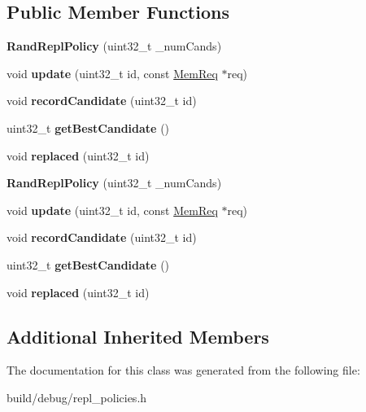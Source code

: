 \subsection*{Public Member Functions}
\begin{DoxyCompactItemize}
\item 
\hypertarget{classRandReplPolicy_a1e08886e13510e155af165e8c3ac0120}{{\bfseries Rand\-Repl\-Policy} (uint32\-\_\-t \-\_\-num\-Cands)}\label{classRandReplPolicy_a1e08886e13510e155af165e8c3ac0120}

\item 
\hypertarget{classRandReplPolicy_a80a6976f9f7c25dad50db398462876a3}{void {\bfseries update} (uint32\-\_\-t id, const \hyperlink{structMemReq}{Mem\-Req} $\ast$req)}\label{classRandReplPolicy_a80a6976f9f7c25dad50db398462876a3}

\item 
\hypertarget{classRandReplPolicy_a92bed65d2acc964c2c5f4d5cc8e369b9}{void {\bfseries record\-Candidate} (uint32\-\_\-t id)}\label{classRandReplPolicy_a92bed65d2acc964c2c5f4d5cc8e369b9}

\item 
\hypertarget{classRandReplPolicy_ab8459c0adc8ed9caf7492313b862e113}{uint32\-\_\-t {\bfseries get\-Best\-Candidate} ()}\label{classRandReplPolicy_ab8459c0adc8ed9caf7492313b862e113}

\item 
\hypertarget{classRandReplPolicy_a75fd48bd27a192896560608890360556}{void {\bfseries replaced} (uint32\-\_\-t id)}\label{classRandReplPolicy_a75fd48bd27a192896560608890360556}

\item 
\hypertarget{classRandReplPolicy_a1e08886e13510e155af165e8c3ac0120}{{\bfseries Rand\-Repl\-Policy} (uint32\-\_\-t \-\_\-num\-Cands)}\label{classRandReplPolicy_a1e08886e13510e155af165e8c3ac0120}

\item 
\hypertarget{classRandReplPolicy_a80a6976f9f7c25dad50db398462876a3}{void {\bfseries update} (uint32\-\_\-t id, const \hyperlink{structMemReq}{Mem\-Req} $\ast$req)}\label{classRandReplPolicy_a80a6976f9f7c25dad50db398462876a3}

\item 
\hypertarget{classRandReplPolicy_a92bed65d2acc964c2c5f4d5cc8e369b9}{void {\bfseries record\-Candidate} (uint32\-\_\-t id)}\label{classRandReplPolicy_a92bed65d2acc964c2c5f4d5cc8e369b9}

\item 
\hypertarget{classRandReplPolicy_ab8459c0adc8ed9caf7492313b862e113}{uint32\-\_\-t {\bfseries get\-Best\-Candidate} ()}\label{classRandReplPolicy_ab8459c0adc8ed9caf7492313b862e113}

\item 
\hypertarget{classRandReplPolicy_a75fd48bd27a192896560608890360556}{void {\bfseries replaced} (uint32\-\_\-t id)}\label{classRandReplPolicy_a75fd48bd27a192896560608890360556}

\end{DoxyCompactItemize}
\subsection*{Additional Inherited Members}


The documentation for this class was generated from the following file\-:\begin{DoxyCompactItemize}
\item 
build/debug/repl\-\_\-policies.\-h\end{DoxyCompactItemize}
